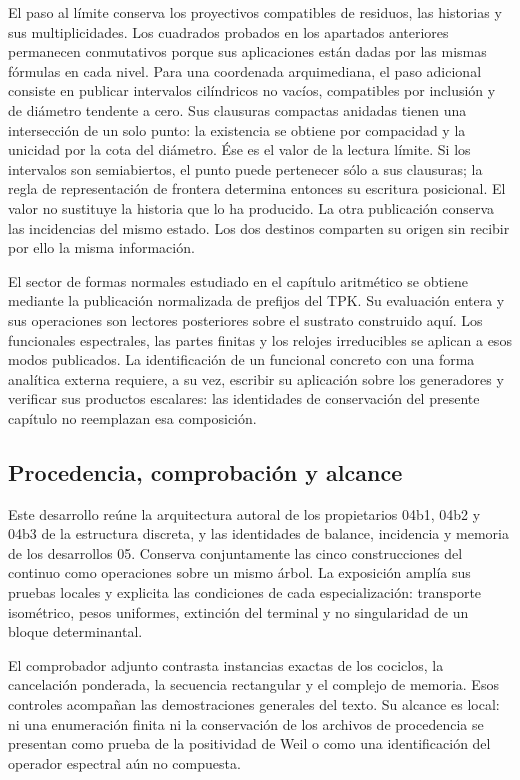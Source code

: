 El paso al límite conserva los proyectivos compatibles de residuos, las historias y sus multiplicidades. Los cuadrados probados en los apartados anteriores permanecen conmutativos porque sus aplicaciones están dadas por las mismas fórmulas en cada nivel. Para una coordenada arquimediana, el paso adicional consiste en publicar intervalos cilíndricos no vacíos, compatibles por inclusión y de diámetro tendente a cero. Sus clausuras compactas anidadas tienen una intersección de un solo punto: la existencia se obtiene por compacidad y la unicidad por la cota del diámetro. Ése es el valor de la lectura límite. Si los intervalos son semiabiertos, el punto puede pertenecer sólo a sus clausuras; la regla de representación de frontera determina entonces su escritura posicional. El valor no sustituye la historia que lo ha producido. La otra publicación conserva las incidencias del mismo estado. Los dos destinos comparten su origen sin recibir por ello la misma información.

El sector de formas normales estudiado en el capítulo aritmético se obtiene mediante la publicación normalizada de prefijos del TPK. Su evaluación entera y sus operaciones son lectores posteriores sobre el sustrato construido aquí. Los funcionales espectrales, las partes finitas y los relojes irreducibles se aplican a esos modos publicados. La identificación de un funcional concreto con una forma analítica externa requiere, a su vez, escribir su aplicación sobre los generadores y verificar sus productos escalares: las identidades de conservación del presente capítulo no reemplazan esa composición.

\clearpage
\subsection{Procedencia, comprobación y alcance}
Este desarrollo reúne la arquitectura autoral de los propietarios 04b1, 04b2 y 04b3 de la estructura discreta, y las identidades de balance, incidencia y memoria de los desarrollos 05. Conserva conjuntamente las cinco construcciones del continuo como operaciones sobre un mismo árbol. La exposición amplía sus pruebas locales y explicita las condiciones de cada especialización: transporte isométrico, pesos uniformes, extinción del terminal y no singularidad de un bloque determinantal.

El comprobador adjunto contrasta instancias exactas de los cociclos, la cancelación ponderada, la secuencia rectangular y el complejo de memoria. Esos controles acompañan las demostraciones generales del texto. Su alcance es local: ni una enumeración finita ni la conservación de los archivos de procedencia se presentan como prueba de la positividad de Weil o como una identificación del operador espectral aún no compuesta.
